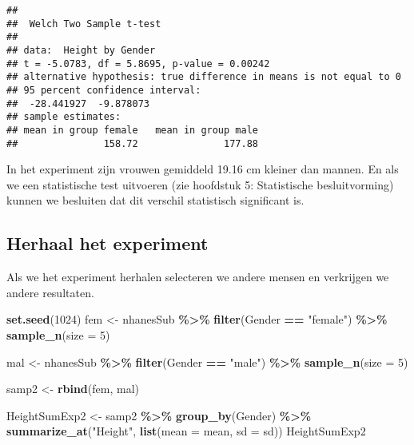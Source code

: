 \documentclass[
  12pt,dutch,coursenotes]{book}
\newenvironment{Shaded}{\begin{snugshade}}{\end{snugshade}}
\newcommand{\DataTypeTok}[1]{\textcolor[rgb]{0.13,0.29,0.53}{#1}}
\newcommand{\DecValTok}[1]{\textcolor[rgb]{0.00,0.00,0.81}{#1}}
\newcommand{\KeywordTok}[1]{\textcolor[rgb]{0.13,0.29,0.53}{\textbf{#1}}}
\newcommand{\NormalTok}[1]{#1}
\newcommand{\OperatorTok}[1]{\textcolor[rgb]{0.81,0.36,0.00}{\textbf{#1}}}
\newcommand{\StringTok}[1]{\textcolor[rgb]{0.31,0.60,0.02}{#1}}
\theoremstyle{definition}
\theoremstyle{definition}
\theoremstyle{definition}
\theoremstyle{remark}
\begin{document}
\begin{verbatim}
## 
##  Welch Two Sample t-test
## 
## data:  Height by Gender
## t = -5.0783, df = 5.8695, p-value = 0.00242
## alternative hypothesis: true difference in means is not equal to 0
## 95 percent confidence interval:
##  -28.441927  -9.878073
## sample estimates:
## mean in group female   mean in group male 
##               158.72               177.88
\end{verbatim}

In het experiment zijn vrouwen gemiddeld 19.16 cm kleiner dan mannen. En als we een statistische test uitvoeren (zie hoofdstuk 5: Statistische besluitvorming) kunnen we besluiten dat dit verschil statistisch significant is.

\hypertarget{herhaal-het-experiment}{%
\subsection{Herhaal het experiment}\label{herhaal-het-experiment}}

Als we het experiment herhalen selecteren we andere mensen en verkrijgen we andere resultaten.

\begin{Shaded}
\begin{Highlighting}[]
\KeywordTok{set.seed}\NormalTok{(}\DecValTok{1024}\NormalTok{)}
\NormalTok{fem \textless{}{-}}\StringTok{ }\NormalTok{nhanesSub }\OperatorTok{\%\textgreater{}\%}\StringTok{ }\KeywordTok{filter}\NormalTok{(Gender }\OperatorTok{==}\StringTok{ "female"}\NormalTok{) }\OperatorTok{\%\textgreater{}\%}\StringTok{ }
\StringTok{    }\KeywordTok{sample\_n}\NormalTok{(}\DataTypeTok{size =} \DecValTok{5}\NormalTok{)}

\NormalTok{mal \textless{}{-}}\StringTok{ }\NormalTok{nhanesSub }\OperatorTok{\%\textgreater{}\%}\StringTok{ }\KeywordTok{filter}\NormalTok{(Gender }\OperatorTok{==}\StringTok{ "male"}\NormalTok{) }\OperatorTok{\%\textgreater{}\%}\StringTok{ }\KeywordTok{sample\_n}\NormalTok{(}\DataTypeTok{size =} \DecValTok{5}\NormalTok{)}

\NormalTok{samp2 \textless{}{-}}\StringTok{ }\KeywordTok{rbind}\NormalTok{(fem, mal)}

\NormalTok{HeightSumExp2 \textless{}{-}}\StringTok{ }\NormalTok{samp2 }\OperatorTok{\%\textgreater{}\%}\StringTok{ }\KeywordTok{group\_by}\NormalTok{(Gender) }\OperatorTok{\%\textgreater{}\%}\StringTok{ }\KeywordTok{summarize\_at}\NormalTok{(}\StringTok{"Height"}\NormalTok{, }
    \KeywordTok{list}\NormalTok{(}\DataTypeTok{mean =}\NormalTok{ mean, }\DataTypeTok{sd =}\NormalTok{ sd))}
\NormalTok{HeightSumExp2}
\end{Highlighting}
\end{Shaded}
\end{document}
